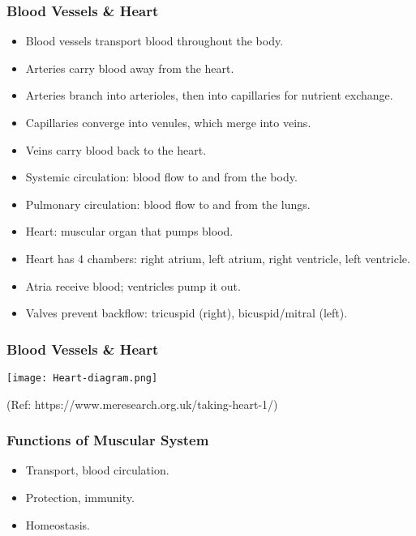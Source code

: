 \begin{frame}[fragile]\frametitle{Blood Vessels \& Heart}

      \begin{itemize}
		\item Blood vessels transport blood throughout the body.
		\item Arteries carry blood away from the heart.
		\item Arteries branch into arterioles, then into capillaries for nutrient exchange.
		\item Capillaries converge into venules, which merge into veins.
		\item Veins carry blood back to the heart.
		\item Systemic circulation: blood flow to and from the body.
		\item Pulmonary circulation: blood flow to and from the lungs.
		\item Heart: muscular organ that pumps blood.
		\item Heart has 4 chambers: right atrium, left atrium, right ventricle, left ventricle.
		\item Atria receive blood; ventricles pump it out.
		\item Valves prevent backflow: tricuspid (right), bicuspid/mitral (left).
	  \end{itemize}
  
\end{frame}

\begin{frame}[fragile]\frametitle{Blood Vessels \& Heart}

		\begin{center}
		\texttt{[image: Heart-diagram.png]}
				
		{\tiny (Ref: https://www.meresearch.org.uk/taking-heart-1/)}
		\end{center}	

\end{frame}


\begin{frame}[fragile]\frametitle{Functions of Muscular System }

      \begin{itemize}
		\item Transport, blood circulation.
		\item Protection, immunity.
		\item Homeostasis.
	  \end{itemize}

\end{frame}

